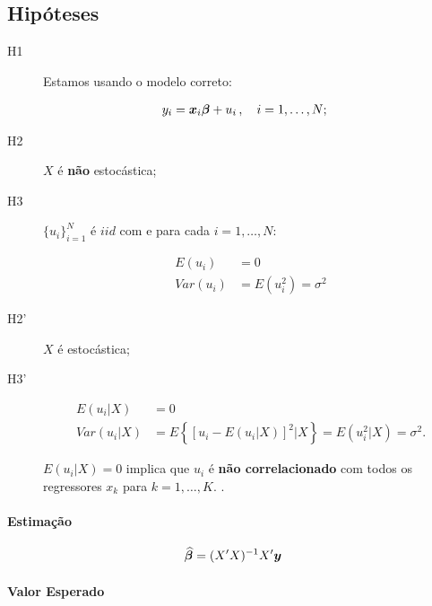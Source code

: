 \documentclass[11pt,oneside,a4paper]{article}
\numberwithin{equation}{section}
\begin{document}
\subsection*{Hipóteses} 

\begin{description}
\item[H1] Estamos usando o modelo correto:

	\vspace{-1.5 em}
\begin{align*}
y_{i} &= \boldsymbol{x}_{i} \boldsymbol{\beta} + u_{i}
\, , \quad i = 1, \dots, N;
\end{align*}

\item[H2] $X$ é \textbf{não} estocástica;
\item[H3] 
$\{ u_{i} \}_{i=1}^{N}$  é  $iid$ com e para cada $i = 1, \dots, N$:

\vspace{-1.5 em}
\begin{align*}
E(u_{i}) &= 0
\\
Var(u_{i}) &= E(u_{i}^2) = \sigma^2
\end{align*}

\item[H2'] $X$ é estocástica;

\item[H3'] 

\begin{align*}
E(u_{i} | X) &= 0
\\
Var(u_{i} | X) &= 
E
\left\{ \left[ 
u_{i} - E( u_{i} | X)
\right]^2 | X \right\}
=
E(u_{i}^2 | X) = \sigma^2.
\end{align*}

$E(u_{i} | X) = 0$ implica que $u_{i}$ é \textbf{não correlacionado} com todos os regressores $x_{k}$ para $k=1,\dots, K$. .
\end{description}

\paragraph{Estimação} 

\begin{align} \label{betahat:ols}
\widehat{\boldsymbol{\beta}} = (X'X)^{-1}X'\boldsymbol{y}
\end{align}

\paragraph{Valor Esperado} 
\end{document}
